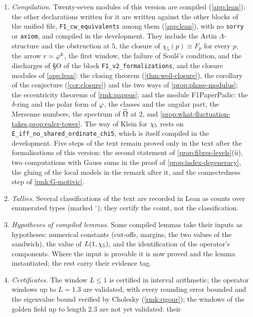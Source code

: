 \begin{enumerate}
  \item \emph{Compilation.}  Twenty-seven modules of this version are compiled (\cref{app:lean}); the other declarations written for it are
    written against the other blocks of the unified file, \texttt{F1\_cw\_equivalents} among them (\cref{app:lean}), with no \texttt{sorry}
    or \texttt{axiom}, and compiled in the development.  They include the Artin $\Lambda$-structure
    and the obstruction at $5$, the closure of $\chi_5(p)\equiv F_p$ for every $p$, the
    arrow $r=\varphi^k$, the first window, the failure of Soul\'e's condition, and the
    discharges of \S O of the block \texttt{F1\_v2\_formalizations}, and the closure modules of
    \cref{app:lean}: the closing theorem (\cref{thm:weil-closure}), the corollary of the conjecture (\cref{cor:closure}) and the two ways of \cref{prop:phase-modulus}; the eccentricity theorems of \cref{rmk:pappus}; and the module F1PaperPadic: the $\delta$-ring and the polar form of $\varphi$, the classes and the angular
    part, the Mersenne numbers, the spectrum of $\widehat{\Omega}$ at $2$, and
    \cref{prop:what-fluctuation-takes,prop:euler-tower}.  The way of
    Klein for $\chi_5$ rests on \texttt{E\_iff\_no\_shared\_ordinate\_chi5}, which is itself
    compiled in the development.
  Five steps of the text remain proved only in the text after the formalisations of this
    version: the second statement of \cref{prop:fibres-levels}(ii), two computations with Gauss
    sums in the proof of \cref{prop:index-degeneracy}, the gluing of the local models in the
    remark after it, and the connectedness step of \cref{rmk:G-motivic}.
  \item \emph{Tallies.}  Several classifications of the text are recorded in Lean as
    counts over enumerated types (marked $^\circ$); they certify the count, not the
    classification.
  \item \emph{Hypotheses of compiled lemmas.}  Some compiled lemmas take their inputs as
    hypotheses: numerical constants (cut-offs, margins, the two values of the
    sandwich), the value of $L(1,\chi_5)$, and the identification of the operator's
    components.  Where the input is provable it is now proved and the lemma
    instantiated; the rest carry their evidence tag.
  \item \emph{Certificates.}  The window $L\le1$ is certified in interval arithmetic; the operator windows up to $L=1.3$ are validated, with every rounding error bounded and the eigenvalue bound verified by Cholesky (\cref{rmk:rigour}); the windows of the golden field up to length $2.3$ are not yet validated: their

\end{enumerate}
